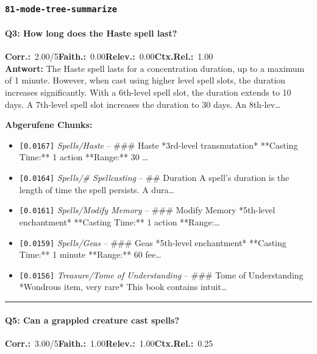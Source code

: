 \subsubsection*{\texttt{81-mode-tree-summarize}}
\label{app:samples:81_mode_tree_summarize}

\paragraph{Q3: How long does the Haste spell last?}
\noindent \textbf{Corr.:}~2.00/5\quad \textbf{Faith.:}~0.00\quad \textbf{Relev.:}~0.00\quad \textbf{Ctx.Rel.:}~1.00\\

\noindent\textbf{Antwort:} The Haste spell lasts for a concentration duration, up to a maximum of 1 minute. However, when cast using higher level spell slots, the duration increases significantly. With a 6th-level spell slot, the duration extends to 10 days. A 7th-level spell slot increases the duration to 30 days. An 8th-lev\ldots

\noindent\textbf{Abgerufene Chunks:}
\begin{itemize}[noitemsep, topsep=2pt]
  \item[\textbf{\#1}] \texttt{[0.0167]} \textit{Spells/Haste} -- \#\#\# Haste  *3rd-level transmutation*  **Casting Time:** 1 action  **Range:** 30 \ldots
  \item[\textbf{\#2}] \texttt{[0.0164]} \textit{Spells/# Spellcasting} -- \#\# Duration  A spell's duration is the length of time the spell persists. A dura\ldots
  \item[\textbf{\#3}] \texttt{[0.0161]} \textit{Spells/Modify Memory} -- \#\#\# Modify Memory  *5th-level enchantment*  **Casting Time:** 1 action  **Range:\ldots
  \item[\textbf{\#4}] \texttt{[0.0159]} \textit{Spells/Geas} -- \#\#\# Geas  *5th-level enchantment*  **Casting Time:** 1 minute  **Range:** 60 fee\ldots
  \item[\textbf{\#5}] \texttt{[0.0156]} \textit{Treasure/Tome of Understanding} -- \#\#\# Tome of Understanding  *Wondrous item, very rare*  This book contains intuit\ldots
\end{itemize}
\vspace{4pt}
\hrule
\vspace{6pt}

\paragraph{Q5: Can a grappled creature cast spells?}
\noindent \textbf{Corr.:}~3.00/5\quad \textbf{Faith.:}~1.00\quad \textbf{Relev.:}~1.00\quad \textbf{Ctx.Rel.:}~0.25\\

